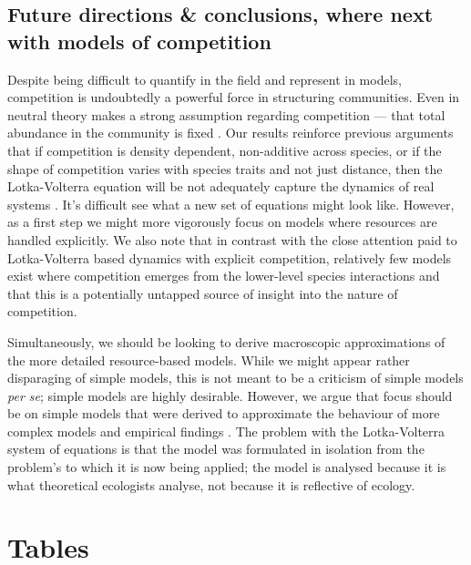 \documentclass[a4paper,11pt]{article}
\begin{document}
\subsection{Future directions \& conclusions, where next with models of
competition}

Despite being difficult to quantify in the field and represent in
models, competition is undoubtedly a powerful force in structuring
communities.
Even in neutral theory makes a
strong assumption regarding competition --- that total abundance in
the community is fixed \citep{Hubbell-2001}.
%
Our results reinforce previous arguments that if competition is
density dependent, non-additive across species, or if the shape of
competition varies with species traits and not just distance, then the
Lotka-Volterra equation will be not adequately capture the dynamics of
real systems \citep{Andrewartha-1953, Neill-1974, Abrams-1975,
  Wangersky-1978,Abrams-1980, Tilman-1987}.  It's difficult see what a
new set of equations might look like.  However, as a first step we
might more vigorously focus on models where resources are handled
explicitly.  We also note that in contrast with the close attention
paid to Lotka-Volterra based dynamics with explicit competition,
relatively few models exist where competition emerges from the
lower-level species interactions and that this is a potentially
untapped source of insight into the nature of competition.

Simultaneously, we should be looking to derive macroscopic
approximations of the more detailed resource-based models.  While we
might appear rather disparaging of simple models, this is not meant
to be a criticism of simple models \textit{per se}; simple models are
highly desirable.  However, we argue that focus should be on simple models
that were derived to approximate the behaviour of more complex models and
empirical findings \citep[e.g.][]{Champagnat-2006}.
The problem with the Lotka-Volterra system of equations is that the
model was formulated in isolation from the problem's to which it is
now being applied; the model is analysed because it is what
theoretical ecologists analyse, not because it is reflective of
ecology.

\clearpage

\section{Tables}
\end{document}
